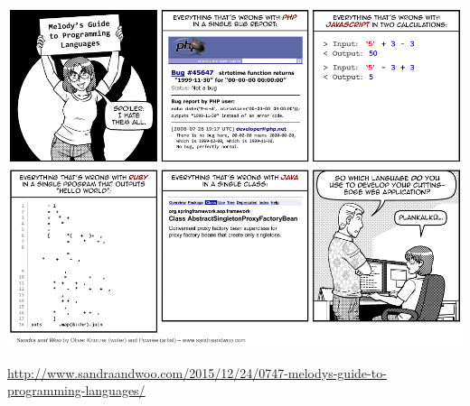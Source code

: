 
\begin{frame}
%
\begin{center}
\includegraphics[width=.75\linewidth]{./gfx/17-saw-melodys-guide-to-programming-languages}

\tiny
\url{http://www.sandraandwoo.com/2015/12/24/0747-melodys-guide-to-programming-languages/}
\end{center}
%
\end{frame}

